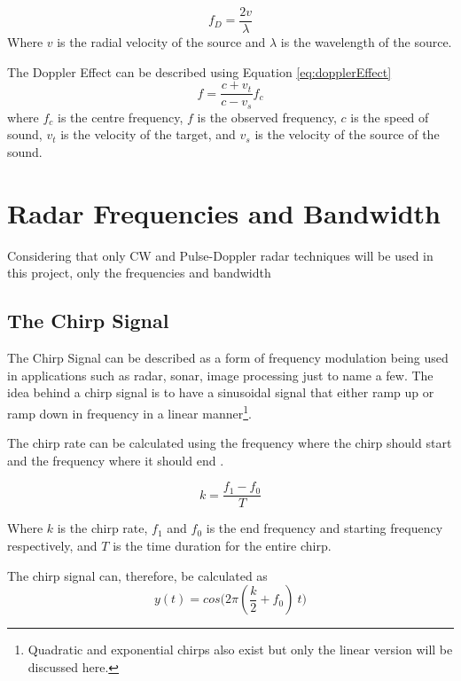 \begin{equation}
f_D = \frac{2v}{\lambda}\label{eq:doppler}
\end{equation}
Where $v$ is the radial velocity of the source and $\lambda$ is the wavelength of the source.

The Doppler Effect can be described using Equation \ref{eq:dopplerEffect}
\begin{equation}
\label{eq:dopplerEffect}
f = \frac{c + v_t}{c - v_s}f_c
\end{equation}
where $f_c$ is the centre frequency, $f$ is the observed frequency, $c$ is the speed of sound, $v_t$ is the velocity of the target, and $v_s$ is the velocity of the source of the sound. 

\section{Radar Frequencies and Bandwidth}

Considering that only CW and Pulse-Doppler radar techniques will be used in this project, only the frequencies and bandwidth 

\subsection{The Chirp Signal\label{sec:chirp}}

The Chirp Signal can be described as a form of frequency modulation being used in applications such as radar, sonar, image processing just to name a few. The idea behind a chirp signal is to have a sinusoidal signal that either ramp up or ramp down in frequency in a linear manner\footnote{Quadratic and exponential chirps also exist but only the linear version will be discussed here.}.

The chirp rate can be calculated using the frequency where the chirp should start and the frequency where it should end \cite{viswanathan_chirp_2019}.

\begin{equation}
    k = \frac{f_1 - f_0}{T}
\end{equation}

Where $k$ is the chirp rate, $f_1$ and $f_0$ is the end frequency and starting frequency respectively, and $T$ is the time duration for the entire chirp.

The chirp signal can, therefore, be calculated as
\begin{equation}
    y(t) = cos \Big( 2\pi(\frac{k}{2} + f_0)\ t \Big)
\end{equation}

